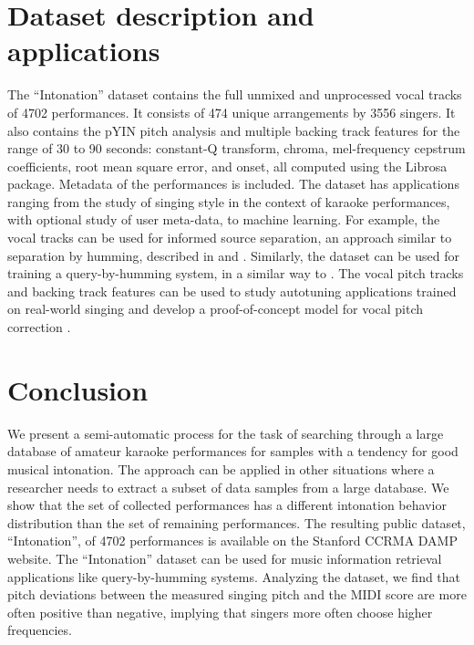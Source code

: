 \begin{appendices}
\section{Dataset description and applications}
The ``Intonation'' dataset contains the full unmixed and unprocessed vocal tracks of 4702 performances. It consists of 474 unique arrangements by 3556 singers. It also contains the pYIN pitch analysis and multiple backing track features for the range of 30 to 90 seconds: constant-Q transform, chroma, mel-frequency cepstrum coefficients, root mean square error, and onset, all computed using the Librosa \cite{mcfee2015librosa} package. Metadata of the performances is included. The dataset has applications ranging from the study of singing style in the context of karaoke performances, with optional study of user meta-data, to machine learning. For example, the vocal tracks can be used for informed source separation, an approach similar to separation by humming, described in \cite{smaragdis2009separation} and \cite{liutkus2012informed}. Similarly, the dataset can be used for training a query-by-humming system, in a similar way to \cite{huq2010crowdsourcing}. The vocal pitch tracks and backing track features can be used to study autotuning applications trained on real-world singing and develop a proof-of-concept model for vocal pitch correction \cite{wager2018pitch}.

\section{Conclusion}
We present a semi-automatic process for the task of searching through a large database of amateur karaoke performances for samples with a tendency for good musical intonation. The approach can be applied in other situations where a researcher needs to extract a subset of data samples from a large database. We show that the set of collected performances has a different intonation behavior distribution than the set of remaining performances. The resulting public dataset, ``Intonation'', of 4702 performances is available on the Stanford CCRMA DAMP website. The ``Intonation'' dataset can be used for music information retrieval applications like query-by-humming systems. Analyzing the dataset, we find that pitch deviations between the measured singing pitch and the MIDI score are more often positive than negative, implying that singers more often choose higher frequencies.

\end{appendices}